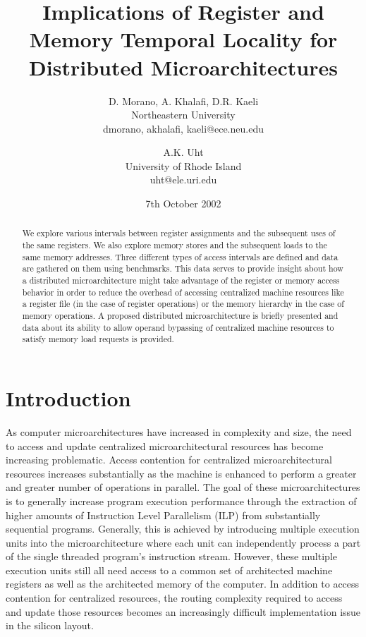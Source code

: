 \documentclass[10pt,dvips]{article}
\begin{document}
%
%
%
\title{Implications of Register and Memory Temporal Locality for
Distributed Microarchitectures}
%
%
\author{
D. Morano, A. Khalafi, D.R. Kaeli\\
Northeastern University\\
{dmorano, akhalafi, kaeli}@ece.neu.edu\\
\and
A.K. Uht\\
University of Rhode Island\\ 
uht@ele.uri.edu
}
%
%
\date{7th October 2002}
%
\maketitle
%
%
%
\begin{abstract}
%
We explore various intervals between register
assignments and the subsequent uses of the same registers.
We also explore memory stores and the
subsequent loads to the same memory addresses.
Three different types of access intervals
are defined and data are gathered on them using benchmarks.
This data serves to provide insight
about how a distributed microarchitecture might take advantage
of the register or memory access behavior in order to reduce the overhead
of accessing centralized machine resources like
a register file (in the case of register operations)
or the memory hierarchy in the case of memory
operations.
A proposed distributed microarchitecture is briefly presented
and data about its ability to allow operand bypassing
of centralized machine resources
to satisfy memory load requests is provided.
%
\end{abstract}
%
%
\section{Introduction}
%
As computer microarchitectures have increased in complexity and
size, the need to access and update centralized microarchitectural
resources has become increasing problematic.
Access contention for centralized microarchitectural resources
increases substantially as the machine is enhanced to perform
a greater and greater number of operations in parallel.
The goal of these microarchitectures is to generally increase
program execution performance through the extraction of higher
amounts of Instruction Level Parallelism (ILP) from substantially
sequential programs.
Generally, this is achieved by introducing multiple
execution units into the microarchitecture where each unit
can independently process a part of the single threaded program's
instruction stream.  
However, these multiple execution units
still all need access to a common set of architected machine registers
as well as the architected memory of the computer.
In addition to access contention for centralized resources,
the routing complexity required to access and update those
resources becomes an increasingly difficult implementation issue
in the silicon layout.
\end{document}
